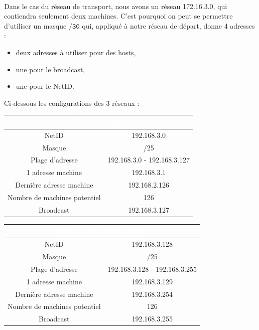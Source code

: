 \documentclass[12pt,a4paper,notitlepage]{article}
\begin{document}
\paragraph{}Dans le cas du réseau de transport, nous avons un réseau 172.16.3.0, qui contiendra seulement deux machines. C'est pourquoi on peut se permettre d'utiliser un masque $\mathtt{/30}$ qui, appliqué à notre réseau de départ, donne 4 adresses : 
\begin{itemize}
\item deux adresses à utiliser pour des hosts,
\item une pour le broadcast,
\item une pour le NetID.\\
\end{itemize}

Ci-dessous les configurations des 3 réseaux :
\begin{center}
\begin{tabular}{| c | c | }
  \hline
 \multicolumn{2}{|c|}{\cellcolor{bleup}\textcolor{white}{Réseau du client}} \\
  \hline
  NetID & 192.168.3.0 \\
  Masque & /25  \\
  Plage d'adresse & 192.168.3.0 - 192.168.3.127\\
  1\up{ère} adresse machine & 192.168.3.1\\
  Dernière adresse machine & 192.168.2.126\\
  Nombre de machines potentiel & 126\\
  Broadcast & 192.168.3.127\\
  \hline
\end{tabular}
\end{center}

\begin{center}
\begin{tabular}{|c|c|}
  \hline
  \multicolumn{2}{|c|}{\cellcolor{bleup}\textcolor{white}{Réseau du seveur (DMZ)}} \\
  \hline
  NetID & 192.168.3.128 \\
  Masque & /25  \\
  Plage d'adresse & 192.168.3.128 - 192.168.3.255\\
  1\up{ère} adresse machine & 192.168.3.129\\
  Dernière adresse machine& 192.168.3.254\\
  Nombre de machines potentiel & 126\\
  Broadcast & 192.168.3.255\\
  \hline
\end{tabular}
\end{center}
\end{document}
